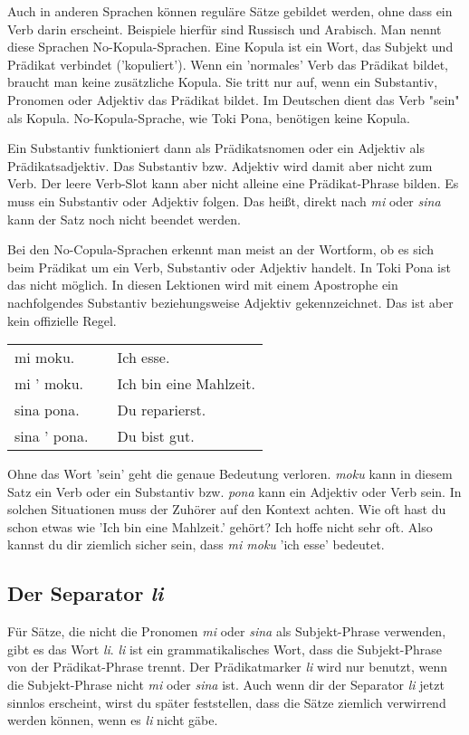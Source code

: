 Auch in anderen Sprachen können reguläre Sätze gebildet werden, ohne dass ein Verb darin erscheint. 
Beispiele hierfür sind Russisch und Arabisch. 
Man nennt diese Sprachen No-Kopula-Sprachen. 
Eine Kopula ist ein Wort, das Subjekt und Prädikat verbindet ('kopuliert').
Wenn ein 'normales' Verb das Prädikat bildet, braucht man keine zusätzliche Kopula.
Sie tritt nur auf, wenn ein Substantiv, Pronomen oder Adjektiv das Prädikat bildet.
Im Deutschen dient das Verb "sein" als Kopula. 
No-Kopula-Sprache, wie Toki Pona, benötigen keine Kopula. 

Ein Substantiv funktioniert dann als Prädikatsnomen oder ein Adjektiv als Prädikatsadjektiv.
Das Substantiv bzw. Adjektiv wird damit aber nicht zum Verb. 
Der leere Verb-Slot kann aber nicht alleine eine Prädikat-Phrase bilden. 
Es muss ein Substantiv oder Adjektiv folgen. 
Das heißt, direkt nach \textit{mi} oder \textit{sina} kann der Satz noch nicht beendet werden. 

Bei den No-Copula-Sprachen erkennt man meist an der Wortform, ob es sich beim Prädikat um ein Verb, Substantiv oder Adjektiv handelt. 
In Toki Pona ist das nicht möglich. 
In diesen Lektionen wird mit einem Apostrophe ein nachfolgendes Substantiv beziehungsweise Adjektiv gekennzeichnet. 
Das ist aber kein offizielle Regel. 

\begin{supertabular}{p{5cm}|ll}
mi moku. && Ich esse.  \\
mi ' moku. && Ich bin eine Mahlzeit. \\ 
sina pona. && Du reparierst. \\   
sina ' pona. && Du bist gut. \\  
\end{supertabular} 

Ohne das Wort 'sein' geht die genaue Bedeutung verloren. 
\textit{moku} kann in diesem Satz ein Verb oder ein Substantiv bzw. \textit{pona} kann 
ein Adjektiv oder Verb sein. 
In solchen Situationen muss der Zuhörer auf den Kontext achten. 
Wie oft hast du schon etwas wie 'Ich bin eine Mahlzeit.' gehört? 
Ich hoffe nicht sehr oft. 
Also kannst du dir ziemlich sicher sein, dass \textit{mi moku} 'ich esse' bedeutet.
%
\subsection*{Der Separator \textit{li}}
%
%
Für Sätze, die nicht die Pronomen \textit{mi} oder \textit{sina} als Subjekt-Phrase verwenden, gibt es das Wort \textit{li}. 
\textit{li} ist ein grammatikalisches Wort, dass die Subjekt-Phrase von der Prädikat-Phrase trennt. 
Der Prädikatmarker \textit{li} wird nur benutzt, wenn die Subjekt-Phrase nicht \textit{mi} oder \textit{sina} ist. 
Auch wenn dir der Separator \textit{li} jetzt sinnlos erscheint, wirst du später feststellen, dass
die Sätze ziemlich verwirrend werden können, wenn es \textit{li} nicht gäbe. 

